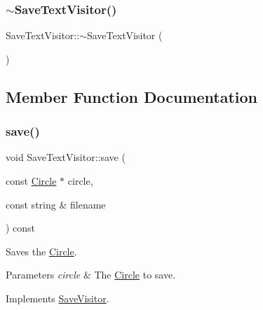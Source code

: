 \hypertarget{class_save_text_visitor_a1939db020915adce6354cc168cd1be3e}{}\label{class_save_text_visitor_a1939db020915adce6354cc168cd1be3e} 
\subsubsection{\texorpdfstring{$\sim$\+Save\+Text\+Visitor()}{~SaveTextVisitor()}}
{\footnotesize\ttfamily Save\+Text\+Visitor\+::$\sim$\+Save\+Text\+Visitor (\begin{DoxyParamCaption}{ }\end{DoxyParamCaption})\hspace{0.3cm}{\ttfamily [virtual]}}



\subsection{Member Function Documentation}
\hypertarget{class_save_text_visitor_a2f083ffe6cda82e0c2fd31d601ba5e30}{}\label{class_save_text_visitor_a2f083ffe6cda82e0c2fd31d601ba5e30} 
\subsubsection{\texorpdfstring{save()}{save()}\hspace{0.1cm}{\footnotesize\ttfamily [1/5]}}
{\footnotesize\ttfamily void Save\+Text\+Visitor\+::save (\begin{DoxyParamCaption}\item[{const \hyperlink{class_circle}{Circle} $\ast$}]{circle,  }\item[{const string \&}]{filename }\end{DoxyParamCaption}) const\hspace{0.3cm}{\ttfamily [virtual]}}

Saves the \hyperlink{class_circle}{Circle}. 
\begin{DoxyParams}{Parameters}
{\em circle} & The \hyperlink{class_circle}{Circle} to save. \\
\hline
\end{DoxyParams}


Implements \hyperlink{class_save_visitor_a2e17acabc377913b745edb2b391052c7}{Save\+Visitor}.

